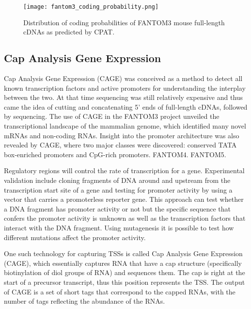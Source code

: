 \begin{figure}[h]
   \centering
   \texttt{[image: fantom3\_coding\_probability.png]}
   \caption[Coding probability of FANTOM3 mouse cDNAs]{Distribution of coding probabilities of FANTOM3 mouse full-length cDNAs as predicted by CPAT\cite{tang2014fantom3codingprob}.}
   \label{fig:fantom3_coding_prob}
\end{figure}

\subsection{Cap Analysis Gene Expression}

Cap Analysis Gene Expression (CAGE) was conceived as a method to detect all known transcription factors and active promoters for understanding the interplay between the two\cite{carninci2010capanalysis}. At that time sequencing was still relatively expensive and thus came the idea of cutting and concatenating 5' ends of full-length cDNAs, followed by sequencing. The use of CAGE in the FANTOM3 project unveiled the transcriptional landscape of the mammalian genome\cite{pmid16141072}, which identified many novel mRNAs and non-coding RNAs. Insight into the promoter architecture was also revealed by CAGE, where two major classes were discovered: conserved TATA box-enriched promoters and CpG-rich promoters\cite{pmid16645617}. FANTOM4\cite{pmid19377474}. FANTOM5\cite{pmid24670764}.

Regulatory regions will control the rate of transcription for a gene. Experimental validation include cloning fragments of DNA around and upstream from the transcription start site of a gene and testing for promoter activity by using a vector that carries a promoterless reporter gene. This approach can test whether a DNA fragment has promoter activity or not but the specific sequence that confers the promoter activity is unknown as well as the transcription factors that interact with the DNA fragment. Using mutagenesis it is possible to test how different mutations affect the promoter activity.

One such technology for capturing TSSs is called Cap Analysis Gene Expression (CAGE), which essentially captures RNA that have a cap structure (specifically biotinylation of diol groups of RNA\cite{pmid8938445}) and sequences them. The cap is right at the start of a precursor transcript, thus this position represents the TSS. The output of CAGE is a set of short tags that correspond to the capped RNAs, with the number of tags reflecting the abundance of the RNAs.

